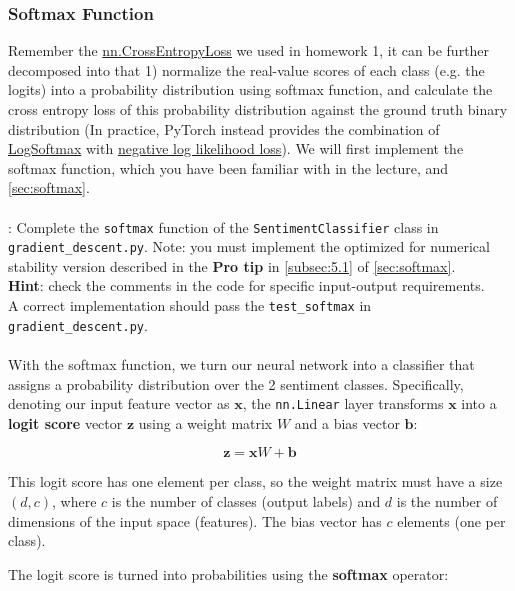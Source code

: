 \subsubsection{Softmax Function}
Remember the \href{https://pytorch.org/docs/stable/generated/torch.nn.CrossEntropyLoss.html}{nn.CrossEntropyLoss} we used in homework 1, it can be further decomposed into that 1) normalize the real-value scores of each class (e.g. the logits) into a probability distribution
using softmax function, and calculate the cross entropy loss of this probability distribution against the ground truth binary distribution (In practice, PyTorch instead provides the combination of \href{https://pytorch.org/docs/stable/generated/torch.nn.LogSoftmax.html#torch.nn.LogSoftmax}{LogSoftmax} with \href{https://pytorch.org/docs/stable/generated/torch.nn.NLLLoss.html#torch.nn.NLLLoss}{negative log likelihood loss}).  We will first implement the softmax function, which you have been familiar with in the lecture, and \autoref{sec:softmax}.
\\\\
\noindent \todo{}: Complete the \texttt{softmax} function of the \texttt{SentimentClassifier} class in \texttt{gradient\_descent.py}. Note: you must implement the optimized for numerical stability version described in the \textbf{Pro tip} in \autoref{subsec:5.1} of \autoref{sec:softmax}.
\\
\noindent \textbf{Hint}: check the comments in the code for specific input-output requirements.
\\
A correct implementation should pass the \texttt{test\_softmax} in \texttt{gradient\_descent.py}.
\\\\
\noindent With the softmax function, we turn our neural network into a classifier that assigns a probability distribution over the 2 sentiment classes. Specifically, denoting our input feature vector as $\mathbf{x}$, the \texttt{nn.Linear} layer transforms $\mathbf{x}$ into a \textbf{logit score} vector $\mathbf{z}$ using a weight matrix $W$ and a bias vector $\mathbf{b}$:

$$
    \mathbf{z} = \mathbf{x} W + \mathbf{b}
$$

This logit score has one element per class, so the weight matrix must have a size $(d, c)$, where $c$ is the number of classes (output labels) and $d$ is the number of dimensions of the input space (features). The bias vector has $c$ elements (one per class).

The logit score is turned into probabilities using the \textbf{softmax}  operator:

